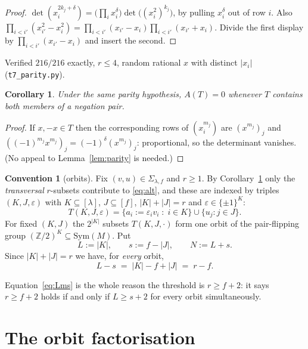 \documentclass[11pt]{article}
\newtheorem{corollary}[theorem]{Corollary}
\theoremstyle{definition}
\newtheorem{convention}[theorem]{Convention}
\theoremstyle{remark}
\newcommand{\ZZ}{\mathbb{Z}}
\begin{document}
\begin{proof}
$\det(x_i^{2k_j+\delta})=\bigl(\prod_i x_i^{\delta}\bigr)\det\bigl((x_i^2)^{k_j}\bigr)$,
by pulling $x_i^{\delta}$ out of row $i$. Also
$\prod_{i<i'}(x_{i'}^2-x_i^2)=\prod_{i<i'}(x_{i'}-x_i)\prod_{i<i'}(x_{i'}+x_i)$. Divide
the first display by $\prod_{i<i'}(x_{i'}-x_i)$ and insert the second.
\end{proof}

Verified $216/216$ exactly, $r\le4$, random rational $x$ with distinct
$|x_i|$ (\texttt{t7\_parity.py}).

\begin{corollary}\label{cor:dead}
Under the same parity hypothesis, $A(T)=0$ whenever $T$ contains both members of a
negation pair.
\end{corollary}

\begin{proof}
If $x,-x\in T$ then the corresponding rows of $(x_i^{m_j})$ are
$(x^{m_j})_j$ and $((-1)^{m_j}x^{m_j})_j=(-1)^{\delta}(x^{m_j})_j$: proportional, so
the determinant vanishes. (No appeal to Lemma~\ref{lem:parity} is needed.)
\end{proof}

\begin{convention}[orbits]\label{conv:orbits}
Fix $(v,u)\in\Sigma_{\lambda,f}$ and $r\ge1$. By Corollary~\ref{cor:dead} only the
\emph{transversal} $r$-subsets contribute to \eqref{eq:alt}, and these are indexed by
triples $(K,J,\varepsilon)$ with $K\subseteq[\lambda]$, $J\subseteq[f]$,
$|K|+|J|=r$ and $\varepsilon\in\{\pm1\}^{K}$:
\[
  T(K,J,\varepsilon)=\{a_i:=\varepsilon_iv_i\;:\;i\in K\}\cup\{u_j:j\in J\}.
\]
For fixed $(K,J)$ the $2^{|K|}$ subsets $T(K,J,\cdot)$ form one orbit of the
pair-flipping group $(\ZZ/2)^{K}\subseteq\mathrm{Sym}(M)$. Put
\[
  L:=|K|,\qquad s:=f-|J|,\qquad N:=L+s .
\]
Since $|K|+|J|=r$ we have, for \emph{every} orbit,
\begin{equation}\label{eq:Lms}
  L-s \;=\; |K|-f+|J| \;=\; r-f .
\end{equation}
\end{convention}

Equation~\eqref{eq:Lms} is the whole reason the threshold is $r\ge f+2$: it says
$r\ge f+2$ holds if and only if $L\ge s+2$ for every orbit simultaneously.

\section{The orbit factorisation}
\end{document}
